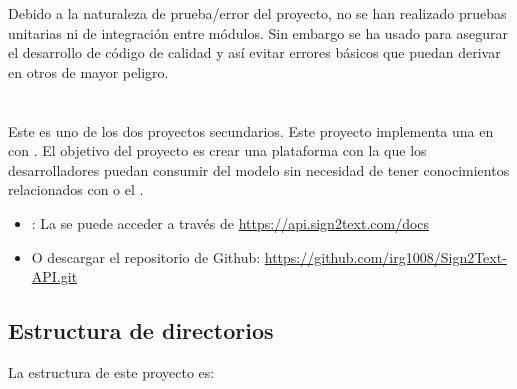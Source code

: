Debido a la naturaleza de prueba/error del proyecto, no se han realizado pruebas unitarias ni de integración entre módulos. Sin embargo se ha usado  para asegurar el desarrollo de código de calidad y así evitar errores básicos que puedan derivar en otros de mayor peligro.


\section{}

Este es uno de los dos proyectos secundarios. Este proyecto implementa una  en  con . El objetivo del proyecto es crear una plataforma con la que los desarrolladores puedan consumir del modelo sin necesidad de tener conocimientos relacionados con  o el  .

\begin{itemize}
  \item {}: La  se puede acceder a través de \url{https://api.sign2text.com/docs}
  \item O descargar el repositorio de Github: \url{https://github.com/irg1008/Sign2Text-API.git}
\end{itemize}


\subsection{Estructura de directorios}

La estructura de este proyecto es:

